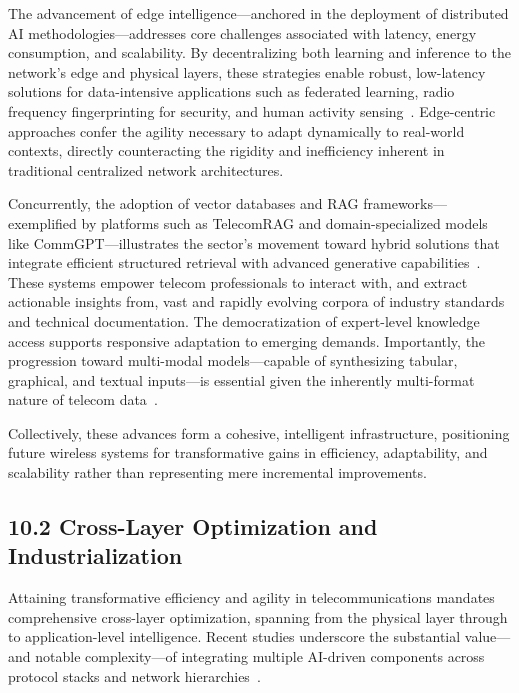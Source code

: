 \documentclass[11pt]{article}
\begin{document}
The advancement of edge intelligence—anchored in the deployment of distributed AI methodologies—addresses core challenges associated with latency, energy consumption, and scalability. By decentralizing both learning and inference to the network's edge and physical layers, these strategies enable robust, low-latency solutions for data-intensive applications such as federated learning, radio frequency fingerprinting for security, and human activity sensing~\cite{ref12,ref14,ref19,ref21,ref25}. Edge-centric approaches confer the agility necessary to adapt dynamically to real-world contexts, directly counteracting the rigidity and inefficiency inherent in traditional centralized network architectures.

Concurrently, the adoption of vector databases and RAG frameworks—exemplified by platforms such as TelecomRAG and domain-specialized models like CommGPT—illustrates the sector's movement toward hybrid solutions that integrate efficient structured retrieval with advanced generative capabilities~\cite{ref11,ref22,ref23,ref29}. These systems empower telecom professionals to interact with, and extract actionable insights from, vast and rapidly evolving corpora of industry standards and technical documentation. The democratization of expert-level knowledge access supports responsive adaptation to emerging demands. Importantly, the progression toward multi-modal models—capable of synthesizing tabular, graphical, and textual inputs—is essential given the inherently multi-format nature of telecom data~\cite{ref21,ref29}.

Collectively, these advances form a cohesive, intelligent infrastructure, positioning future wireless systems for transformative gains in efficiency, adaptability, and scalability rather than representing mere incremental improvements.

\subsection{10.2 Cross-Layer Optimization and Industrialization}

Attaining transformative efficiency and agility in telecommunications mandates comprehensive cross-layer optimization, spanning from the physical layer through to application-level intelligence. Recent studies underscore the substantial value—and notable complexity—of integrating multiple AI-driven components across protocol stacks and network hierarchies~\cite{ref12,ref14,ref20,ref21,ref24,ref25,ref26,ref29}.
\end{document}

